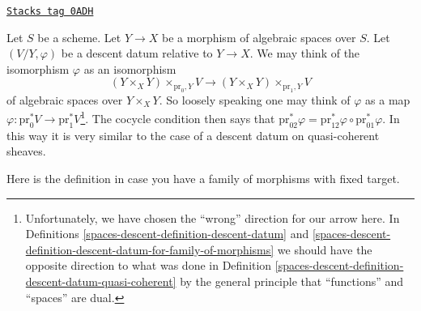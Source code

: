 \begin{remark}[Easier]
\label{spaces-descent-remark-easier}
\href{https://stacks.math.columbia.edu/tag/0ADH}{\texttt{Stacks tag 0ADH}}

Let $S$ be a scheme.
Let $Y \to X$ be a morphism of algebraic spaces over $S$.
Let $(V/Y, \varphi)$ be a descent datum relative to $Y \to X$.
We may think of the isomorphism $\varphi$ as an isomorphism
$$
(Y \times_X Y) \times_{\text{pr}_0, Y} V
\longrightarrow
(Y \times_X Y) \times_{\text{pr}_1, Y} V
$$
of algebraic spaces over $Y \times_X Y$. So loosely speaking one may
think of $\varphi$ as a map
$\varphi : \text{pr}_0^*V \to \text{pr}_1^*V$\footnote{Unfortunately,
we have chosen the ``wrong'' direction for our arrow here. In
Definitions \ref{spaces-descent-definition-descent-datum} and
\ref{spaces-descent-definition-descent-datum-for-family-of-morphisms}
we should have the opposite direction to what was done in
Definition \ref{spaces-descent-definition-descent-datum-quasi-coherent}
by the general principle that ``functions'' and ``spaces'' are dual.}.
The cocycle condition then says that
$\text{pr}_{02}^*\varphi =
\text{pr}_{12}^*\varphi \circ \text{pr}_{01}^*\varphi$.
In this way it is very similar to the case of a descent datum on
quasi-coherent sheaves.
\end{remark}

Here is the definition in case you have a family of morphisms
with fixed target.

